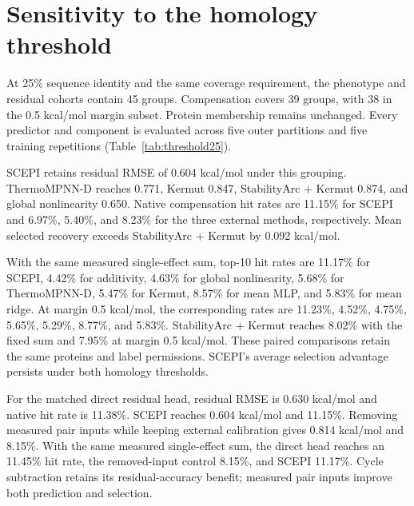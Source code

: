 \documentclass{llncs}
\begin{document}
\section{Sensitivity to the homology threshold}

At 25\% sequence identity and the same coverage requirement, the phenotype and residual cohorts contain 45 groups. Compensation covers 39 groups, with 38 in the 0.5 kcal/mol margin subset. Protein membership remains unchanged. Every predictor and component is evaluated across five outer partitions and five training repetitions (Table~\ref{tab:threshold25}).

SCEPI retains residual RMSE of 0.604 kcal/mol under this grouping. ThermoMPNN-D reaches 0.771, Kermut 0.847, StabilityArc + Kermut 0.874, and global nonlinearity 0.650. Native compensation hit rates are 11.15\% for SCEPI and 6.97\%, 5.40\%, and 8.23\% for the three external methods, respectively. Mean selected recovery exceeds StabilityArc + Kermut by 0.092 kcal/mol.

With the same measured single-effect sum, top-10 hit rates are 11.17\% for SCEPI, 4.42\% for additivity, 4.63\% for global nonlinearity, 5.68\% for ThermoMPNN-D, 5.47\% for Kermut, 8.57\% for mean MLP, and 5.83\% for mean ridge. At margin 0.5 kcal/mol, the corresponding rates are 11.23\%, 4.52\%, 4.75\%, 5.65\%, 5.29\%, 8.77\%, and 5.83\%. StabilityArc + Kermut reaches 8.02\% with the fixed sum and 7.95\% at margin 0.5 kcal/mol. These paired comparisons retain the same proteins and label permissions. SCEPI's average selection advantage persists under both homology thresholds.

For the matched direct residual head, residual RMSE is 0.630 kcal/mol and native hit rate is 11.38\%. SCEPI reaches 0.604 kcal/mol and 11.15\%. Removing measured pair inputs while keeping external calibration gives 0.814 kcal/mol and 8.15\%. With the same measured single-effect sum, the direct head reaches an 11.45\% hit rate, the removed-input control 8.15\%, and SCEPI 11.17\%. Cycle subtraction retains its residual-accuracy benefit; measured pair inputs improve both prediction and selection.
\end{document}
